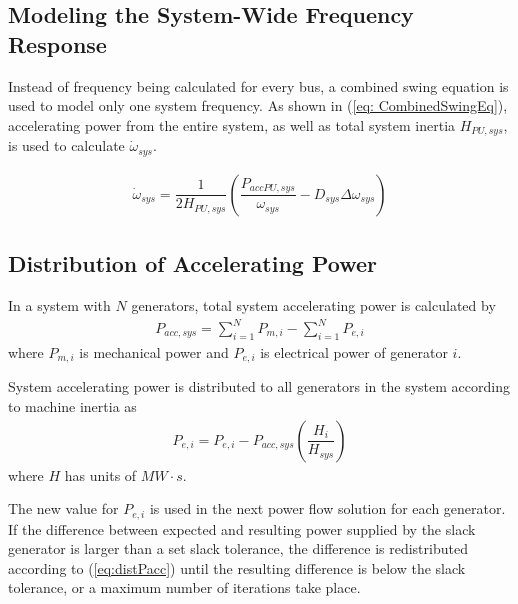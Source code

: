 \subsection{Modeling the System-Wide Frequency Response}
Instead of frequency being calculated for every bus, a combined swing equation is used to model only one system frequency.
As shown in (\ref{eq: CombinedSwingEq}), accelerating power from the entire system, as well as total system inertia $H_{PU, sys}$, is used to calculate $\dot{\omega}_{sys}$.

\begin{align}
\dot{\omega}_{sys} = \dfrac{1}{2H_{PU, sys} } \left( \dfrac{P_{acc PU, sys} }{\omega_{sys}} - D_{sys}\Delta\omega_{sys}  \right) \label{eq: CombinedSwingEq}
\end{align} 

\subsection{Distribution of Accelerating Power}
In a system with $N$ generators, total system accelerating power is calculated by
\begin{align}
P_{acc, sys} = \sum_{i=1}^{N} P_{m,i}  - \sum_{i=1}^{N} P_{e,i} \label{eq:Pacc} 
\end{align}
\noindent where $P_{m,i}$ is mechanical power and $P_{e,i}$ is electrical power of generator $i$.

System accelerating power is distributed to all generators in the system according to machine inertia as
\begin{align}
P_{e, i} = P_{e, i}  - P_{acc, sys}\left( \dfrac{H_i}{H_{sys}}\right) \label{eq:distPacc}
\end{align}
where $H$ has units of $MW\cdot s$.

The new value for $P_{e, i}$ is used in the next power flow solution for each generator.
If the difference between expected and resulting power supplied by the slack generator is larger than a set slack tolerance, the difference is redistributed according to (\ref{eq:distPacc}) until the resulting difference is below the slack tolerance, or a maximum number of iterations take place\cite{Stajcar}.

